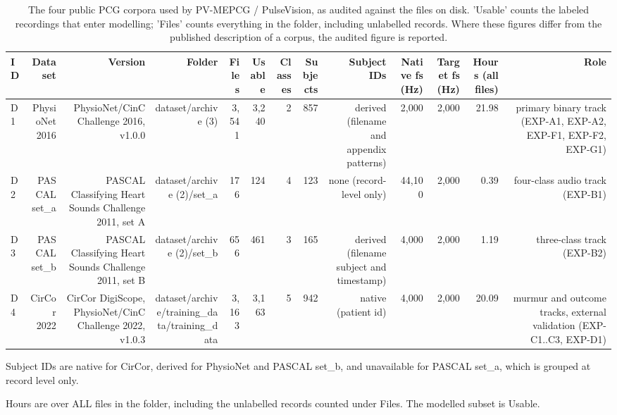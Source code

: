 \begin{table}[htbp]
  \centering
  \caption{The four public PCG corpora used by PV-MEPCG / PulseVision, as audited against the files on disk. 'Usable' counts the labeled recordings that enter modelling; 'Files' counts everything in the folder, including unlabelled records. Where these figures differ from the published description of a corpus, the audited figure is reported.}
  \label{tab:t01}
  \begin{tabular}{lrrrrrrrrrrrr}
    \toprule
    ID & Dataset & Version & Folder & Files & Usable & Classes & Subjects & Subject IDs & Native fs (Hz) & Target fs (Hz) & Hours (all files) & Role \\
    \midrule
    D1 & PhysioNet 2016 & PhysioNet/CinC Challenge 2016, v1.0.0 & dataset/archive (3) & 3,541 & 3,240 & 2 & 857 & derived (filename and appendix patterns) & 2,000 & 2,000 & 21.98 & primary binary track (EXP-A1, EXP-A2, EXP-F1, EXP-F2, EXP-G1) \\
    D2 & PASCAL set\_a & PASCAL Classifying Heart Sounds Challenge 2011, set A & dataset/archive (2)/set\_a & 176 & 124 & 4 & 123 & none (record-level only) & 44,100 & 2,000 & 0.39 & four-class audio track (EXP-B1) \\
    D3 & PASCAL set\_b & PASCAL Classifying Heart Sounds Challenge 2011, set B & dataset/archive (2)/set\_b & 656 & 461 & 3 & 165 & derived (filename subject and timestamp) & 4,000 & 2,000 & 1.19 & three-class track (EXP-B2) \\
    D4 & CirCor 2022 & CirCor DigiScope, PhysioNet/CinC Challenge 2022, v1.0.3 & dataset/archive/training\_data/training\_data & 3,163 & 3,163 & 5 & 942 & native (patient id) & 4,000 & 2,000 & 20.09 & murmur and outcome tracks, external validation (EXP-C1..C3, EXP-D1) \\
    \bottomrule
  \end{tabular}
  \par\footnotesize Subject IDs are native for CirCor, derived for PhysioNet and PASCAL set\_b, and unavailable for PASCAL set\_a, which is grouped at record level only.
  \par\footnotesize Hours are over ALL files in the folder, including the unlabelled records counted under Files. The modelled subset is Usable.
\end{table}
